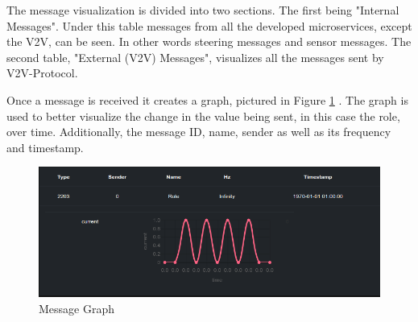 \documentclass[12pt]{article}
\begin{document}
The message visualization is divided into two sections. The first being "Internal Messages". Under this table messages from all the developed microservices, except the V2V, can be seen. In other words steering messages and sensor messages. The second table, "External (V2V) Messages", visualizes all the messages sent by V2V-Protocol. \par

Once a message is received it creates a graph, pictured in Figure \ref{fig:message graph} . The graph is used to better visualize the change in the value being sent, in this case the role, over time. Additionally, the message ID, name, sender as well as its frequency and timestamp.
\FloatBarrier %
\begin{figure}[h]
\centering
\includegraphics[width=\linewidth]{Images/message_role.png}
\caption{Message Graph}
\label{fig:message graph}
\end{figure}
\FloatBarrier %
\end{document}
